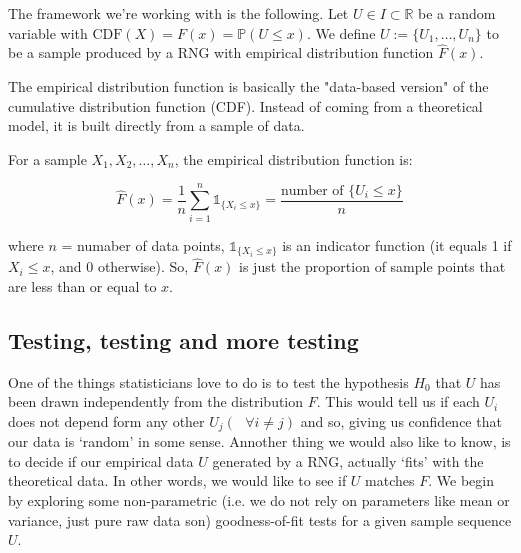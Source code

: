\vspace{0.2cm}

The framework we're working with is the following. Let $U \in I \subset \mathbb{R}$ be a random variable with $\text{CDF}(X) = F(x) = \mathbb{P}(U \leq x)$. We define $U := \{U_1, \ldots, U_n\}$
to be a sample produced by a RNG with empirical distribution function $\hat{F}(x)$.  

\begin{remark}
    The empirical distribution function is basically the "data-based version" 
of the cumulative distribution function (CDF). Instead of coming from a 
theoretical model, it is built directly from a sample of data.

For a sample \(X_1, X_2, \ldots, X_n\), the empirical distribution function is:

\[
\hat{F}(x) = \frac{1}{n} \sum_{i=1}^{n} \mathds{1}_{\{X_i \leq x\}} = \frac{\text{number of } \{U_i \leq x\}}{n}
\]

where \(n\) = numaber of data points, \(\mathds{1}_{\{X_i \leq x\}}\) is an indicator function (it equals 1 if 
\(X_i \leq x\), and 0 otherwise). So, \(\hat{F}(x)\) is just the proportion of sample points that are 
less than or equal to \(x\).  
\end{remark}

\vspace{0.2cm}

\subsection{Testing, testing and more testing}

One of the things statisticians love to do is to test the hypothesis $H_0$ that $U$ has been drawn independently from the distribution $F$. This would tell us if
each $U_i$ does not depend form any other $U_j (\text{ }\forall i \neq j)$ and so, giving us confidence that our data is `random' in some sense. Annother thing we would also like to know, is to decide if our empirical data $U$ generated by a RNG, actually `fits' with the theoretical data. In other words,
we would like to see if $U$ matches $F$. We begin by exploring some non-parametric (i.e. we do not rely on parameters like mean or variance, just pure raw data son) goodness-of-fit tests for a given sample sequence $U$.

